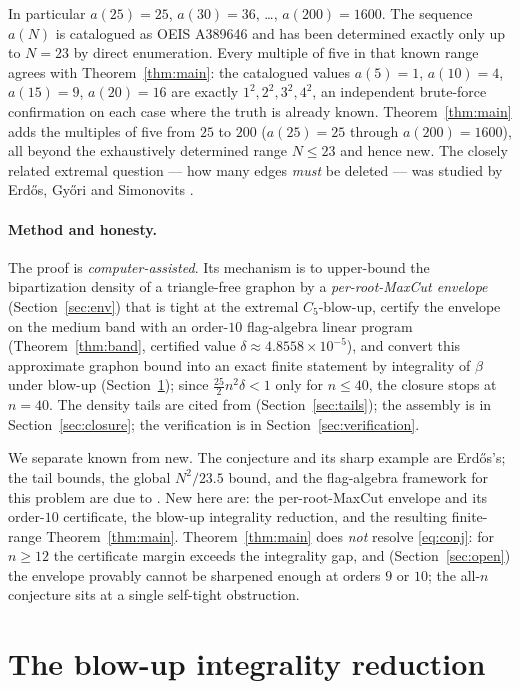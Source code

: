 \documentclass[11pt]{article}
\theoremstyle{remark}
\newcommand{\bip}{\beta}
\begin{document}
In particular $a(25)=25$, $a(30)=36$, \dots, $a(200)=1600$. The sequence $a(N)$ is
catalogued as OEIS A389646 \cite{A389646} and has been determined exactly only up
to $N=23$ by direct enumeration. Every multiple of five in that known range agrees
with Theorem~\ref{thm:main}: the catalogued values $a(5)=1$, $a(10)=4$, $a(15)=9$,
$a(20)=16$ are exactly $1^2,2^2,3^2,4^2$, an independent brute-force confirmation
on each case where the truth is already known. Theorem~\ref{thm:main} adds the
multiples of five from $25$ to $200$ ($a(25)=25$ through $a(200)=1600$), all beyond
the exhaustively determined range $N\le 23$ and hence new. The closely related
extremal question --- how many edges \emph{must} be deleted --- was studied by
Erd\H{o}s, Gy\H{o}ri and Simonovits \cite{EGS92}.

\paragraph{Method and honesty.} The proof is \emph{computer-assisted}. Its
mechanism is to upper-bound the bipartization density of a triangle-free graphon by
a \emph{per-root-MaxCut envelope} (Section~\ref{sec:env}) that is tight at the
extremal $C_5$-blow-up, certify the envelope on the medium band with an order-$10$
flag-algebra linear program (Theorem~\ref{thm:band}, certified value
$\delta\approx 4.8558\times10^{-5}$), and convert this approximate graphon bound into
an exact finite statement by integrality of $\bip$ under blow-up
(Section~\ref{sec:reduction}); since $\tfrac{25}{2}n^2\delta<1$ only for $n\le 40$,
the closure stops at $n=40$. The density tails are cited from \cite{BCL21}
(Section~\ref{sec:tails}); the assembly is in Section~\ref{sec:closure}; the
verification is in Section~\ref{sec:verification}.

We separate known from new. The conjecture and its sharp example are Erd\H{o}s's;
the tail bounds, the global $N^2/23.5$ bound, and the flag-algebra framework for
this problem are due to \cite{BCL21,Raz07}. New here are: the per-root-MaxCut
envelope and its order-$10$ certificate, the blow-up integrality reduction, and the
resulting finite-range Theorem~\ref{thm:main}. Theorem~\ref{thm:main} does
\emph{not} resolve \eqref{eq:conj}: for $n\ge 12$ the certificate margin exceeds
the integrality gap, and (Section~\ref{sec:open}) the envelope provably cannot be
sharpened enough at orders $9$ or $10$; the all-$n$ conjecture sits at a single
self-tight obstruction.

\section{The blow-up integrality reduction}\label{sec:reduction}
\end{document}
